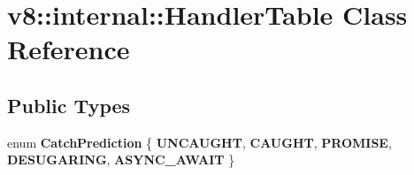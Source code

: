 \hypertarget{classv8_1_1internal_1_1HandlerTable}{}\section{v8\+:\+:internal\+:\+:Handler\+Table Class Reference}
\label{classv8_1_1internal_1_1HandlerTable}
\subsection*{Public Types}
\begin{DoxyCompactItemize}
\item 
\mbox{\label{classv8_1_1internal_1_1HandlerTable_a1d4e928c63ab7c79779838058fdf8435}} 
enum {\bfseries Catch\+Prediction} \{ \newline
{\bfseries U\+N\+C\+A\+U\+G\+HT}, 
{\bfseries C\+A\+U\+G\+HT}, 
{\bfseries P\+R\+O\+M\+I\+SE}, 
{\bfseries D\+E\+S\+U\+G\+A\+R\+I\+NG}, 
\newline
{\bfseries A\+S\+Y\+N\+C\+\_\+\+A\+W\+A\+IT}
 \}
\end{DoxyCompactItemize}
